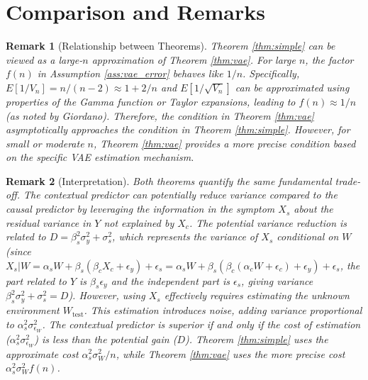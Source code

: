 \documentclass[11pt]{article}
\newtheorem{remark}{Remark}[section]
\begin{document}
\section{Comparison and Remarks}

\begin{remark}[Relationship between Theorems]
Theorem \ref{thm:simple} can be viewed as a large-$n$ approximation of Theorem \ref{thm:vae}. For large $n$, the factor $f(n)$ in Assumption \ref{ass:vae_error} behaves like $1/n$. Specifically, $E[1/V_n] = n/(n-2) \approx 1 + 2/n$ and $E[1/\sqrt{V_n}]$ can be approximated using properties of the Gamma function or Taylor expansions, leading to $f(n) \approx 1/n$ (as noted by Giordano). Therefore, the condition in Theorem \ref{thm:vae} asymptotically approaches the condition in Theorem \ref{thm:simple}. However, for small or moderate $n$, Theorem \ref{thm:vae} provides a more precise condition based on the specific VAE estimation mechanism.
\end{remark}

\begin{remark}[Interpretation]
Both theorems quantify the same fundamental trade-off. The contextual predictor can potentially reduce variance compared to the causal predictor by leveraging the information in the symptom $X_s$ about the residual variance in $Y$ not explained by $X_c$. The potential variance reduction is related to $D = \beta_s^2 \sigma_y^2 + \sigma_s^2$, which represents the variance of $X_s$ conditional on $W$ (since $X_s | W = \alpha_s W + \beta_s(\beta_c X_c + \epsilon_y) + \epsilon_s = \alpha_s W + \beta_s(\beta_c (\alpha_c W + \epsilon_c) + \epsilon_y) + \epsilon_s$, the part related to $Y$ is $\beta_s \epsilon_y$ and the independent part is $\epsilon_s$, giving variance $\beta_s^2 \sigma_y^2 + \sigma_s^2 = D$). However, using $X_s$ effectively requires estimating the unknown environment $W_{\text{test}}$. This estimation introduces noise, adding variance proportional to $\alpha_s^2 \sigma_{\epsilon_W}^2$. The contextual predictor is superior if and only if the cost of estimation ($\alpha_s^2 \sigma_{\epsilon_W}^2$) is less than the potential gain ($D$). Theorem \ref{thm:simple} uses the approximate cost $\alpha_s^2 \sigma_W^2 / n$, while Theorem \ref{thm:vae} uses the more precise cost $\alpha_s^2 \sigma_W^2 f(n)$.
\end{remark}
\end{document}
